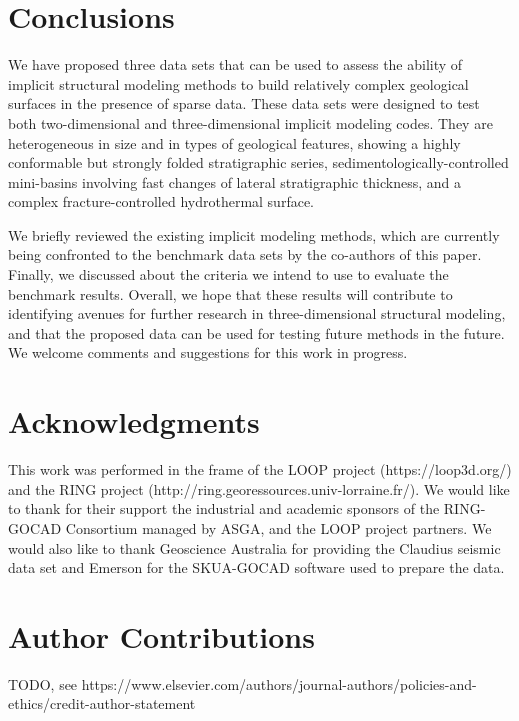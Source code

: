 \documentclass[preprint]{elsarticle}
\begin{document}
 


\section*{Conclusions}

We have proposed three data sets that can be used to assess the ability of implicit structural modeling methods to build relatively complex geological surfaces in the presence of sparse data. These data sets were designed to test both two-dimensional and three-dimensional implicit modeling codes. They are heterogeneous in size and in types of geological features, showing a highly conformable but strongly folded stratigraphic series, sedimentologically-controlled mini-basins involving fast changes of lateral stratigraphic thickness, and a complex fracture-controlled hydrothermal surface. 

We briefly reviewed the existing implicit modeling methods, which are currently being confronted to the benchmark data sets by the co-authors of this paper. Finally, we discussed about the criteria we intend to use to evaluate the benchmark results. 
Overall, we hope that these results will contribute to identifying avenues for further research in three-dimensional structural modeling, and that the proposed data can be used for testing future methods in the future. We welcome comments and suggestions for this work in progress. 

\section*{Acknowledgments}

This work was performed in the frame of the LOOP project (https://loop3d.org/) and the RING project (http://ring.georessources.univ-lorraine.fr/). We would like to thank for their support the industrial and academic sponsors of the RING-GOCAD Consortium managed by ASGA, and the LOOP project partners. We would also like to thank Geoscience Australia for providing the Claudius seismic data set and Emerson for the SKUA-GOCAD software used to prepare the data. 

\section*{Author Contributions}
 TODO, see https://www.elsevier.com/authors/journal-authors/policies-and-ethics/credit-author-statement




\end{document}
